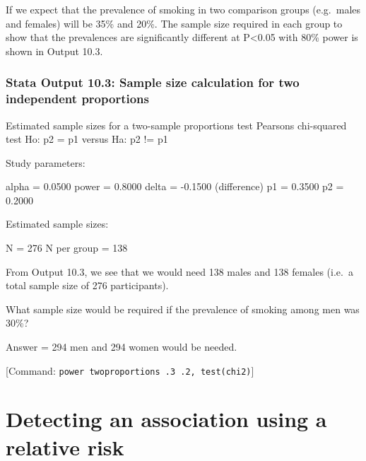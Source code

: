\documentclass[
]{memoir}
\newenvironment{Shaded}{\begin{snugshade}}{\end{snugshade}}
\newcommand{\NormalTok}[1]{#1}
\begin{document}
If we expect that the prevalence of smoking in two comparison groups (e.g.~males and females) will be 35\% and 20\%. The sample size required in each group to show that the prevalences are significantly different at P\textless0.05 with 80\% power is shown in Output 10.3.

\hypertarget{stata-output-10.3-sample-size-calculation-for-two-independent-proportions}{%
\subsubsection*{Stata Output 10.3: Sample size calculation for two independent proportions}\label{stata-output-10.3-sample-size-calculation-for-two-independent-proportions}}

\begin{Shaded}
\begin{Highlighting}[]
\NormalTok{Estimated sample sizes for a two{-}sample proportions test}
\NormalTok{Pearson\textquotesingle{}s chi{-}squared test }
\NormalTok{Ho: p2 = p1  versus  Ha: p2 != p1}

\NormalTok{Study parameters:}

\NormalTok{        alpha =    0.0500}
\NormalTok{        power =    0.8000}
\NormalTok{        delta =   {-}0.1500  (difference)}
\NormalTok{           p1 =    0.3500}
\NormalTok{           p2 =    0.2000}

\NormalTok{Estimated sample sizes:}

\NormalTok{            N =       276}
\NormalTok{  N per group =       138}
\end{Highlighting}
\end{Shaded}

From Output 10.3, we see that we would need 138 males and 138 females (i.e.~a total sample size of 276 participants).

What sample size would be required if the prevalence of smoking among men was 30\%?

Answer = 294 men and 294 women would be needed.

{[}Command: \texttt{power\ twoproportions\ .3\ .2,\ test(chi2)}{]}

\hypertarget{detecting-an-association-using-a-relative-risk}{%
\section{Detecting an association using a relative risk}\label{detecting-an-association-using-a-relative-risk}}
\end{document}
